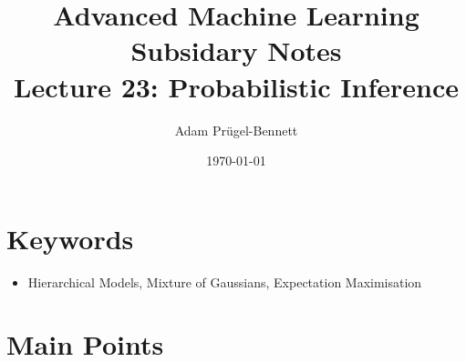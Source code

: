 \documentclass[11pt]{article}
\author{Adam Prügel-Bennett}
\date{\today}
\title{Advanced Machine Learning Subsidary Notes\\\medskip
\large Lecture 23: Probabilistic Inference}
\begin{document}
\maketitle


\section{Keywords}
\label{sec:org42594cf}
\begin{itemize}
\item Hierarchical Models, Mixture of Gaussians, Expectation Maximisation
\end{itemize}


\section{Main Points}
\label{sec:org7d3b6af}
\end{document}
